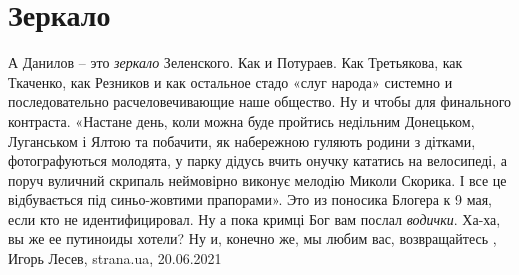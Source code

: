  
 
 
 
 
\chapter{Зеркало}

А Данилов – это \emph{зеркало} Зеленского. Как и Потураев. Как Третьякова, как
Ткаченко, как Резников и как остальное стадо «слуг народа» системно и
последовательно расчеловечивающие наше общество.  Ну и чтобы для финального
контраста. «Настане день, коли можна буде пройтись недільним Донецьком,
Луганськом і Ялтою та побачити, як набережною гуляють родини з дітками,
фотографуються молодята, у парку дідусь вчить онучку кататись на велосипеді, а
поруч вуличний скрипаль неймовірно виконує мелодію Миколи Скорика. І все це
відбувається під синьо-жовтими прапорами». Это из поносика Блогера к 9 мая,
если кто не идентифицировал. Ну а пока кримці Бог вам послал \emph{водички}. Ха-ха, вы
же ее путиноиды хотели? Ну и, конечно же, мы любим вас, возвращайтесь
, 
Игорь Лесев, strana.ua, 20.06.2021

